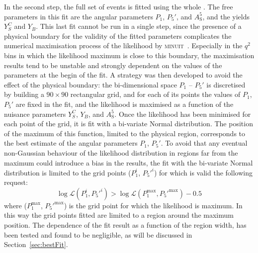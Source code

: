 In the second step, the full set of events is fitted using the whole \pdf.
The free parameters in this fit are the angular parameters $P_1$, $P_5'$, and $A^5_\mathrm{S}$, and the yields $Y^{C}_{S}$ and $Y_{B}$.
This last fit cannot be run in a single step, since the presence of a physical boundary for the validity of the fitted parameters complicates the numerical maximisation process of the likelihood by \textsc{minuit}~\cite{Minuit}.
Especially in the $q^2$ bins in which the likelihood maximum is close to this boundary, the maximisation results tend to be unstable and strongly dependent on the values of the parameters at the begin of the fit.
A strategy was then developed to avoid the effect of the physical boundary: the bi-dimensional space $P_1$ -- $P_5'$ is discretised by building a $90\times90$ rectangular grid, and for each of its points the values of $P_1$, $P_5'$ are fixed in the fit, and the likelihood is maximised as a function of the nuisance parameters $Y^{C}_{S}$, $Y_{B}$, and $A^5_\mathrm{S}$.
Once the likelihood has been minimised for each point of the grid, it is fit with a bi-variate Normal distribution.
The position of the maximum of this function, limited to the physical region, corresponds to the best estimate of the angular parameters $P_1$, $P_5'$.
To avoid that any eventual non-Gaussian behaviour of the likelihood distribution in regions far from the maximum could introduce a bias in the results, the fit with the bi-variate Normal distribution is limited to the grid points ($P_1^i$, $P_5'^i$) for which is valid the following request: $$\log\mathcal{L}(P_1^i,P_5'^i) > \log\mathcal{L}(P_1^{\mathrm{max}},P_5'^{\mathrm{max}}) - 0.5$$ where ($P_1^{\mathrm{max}}$, $P_5'^{\mathrm{max}}$) is the grid point for which the likelihood is maximum.
In this way the grid points fitted are limited to a region around the maximum position.
The dependence of the fit result as a function of the region width, has been tested and found to be negligible, as will be discussed in Section~\ref{sec:bestFit}.

